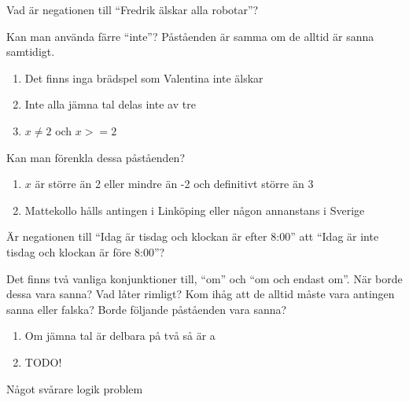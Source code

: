 \begin{problem}
	Vad är negationen till ``Fredrik älskar alla robotar''?
\end{problem}

\begin{problem}
	Kan man använda färre ``inte''? Påståenden är samma om de alltid är sanna samtidigt.
	\begin{enumerate}
		\item Det finns inga brädspel som Valentina inte älskar
		\item Inte alla jämna tal delas inte av tre
		\item \(x \neq 2\) och \(x>= 2\) 
	\end{enumerate}
\end{problem}

\begin{problem}
	Kan man förenkla dessa påståenden?
	\begin{enumerate}
		\item \(x\) är större än 2 eller mindre än -2 och definitivt större än 3
		\item Mattekollo hålls antingen i Linköping eller någon annanstans i Sverige
	\end{enumerate}
\end{problem}

\begin{problem}
	Är negationen till ``Idag är tisdag och klockan är efter 8:00'' att ``Idag är inte tisdag och klockan är före 8:00''?
\end{problem}

\begin{problem}[Extra]
	Det finns två vanliga konjunktioner till, ``om'' och ``om och endast om''. När borde dessa vara sanna? Vad låter rimligt? Kom ihåg att de alltid måste vara antingen sanna eller falska? Borde följande påståenden vara sanna?
	\begin{enumerate}
		\item Om jämna tal är delbara på två så är a
		\item TODO!
	\end{enumerate}
\end{problem}

\begin{problem}[Extra]
	Något svårare logik problem
\end{problem}








